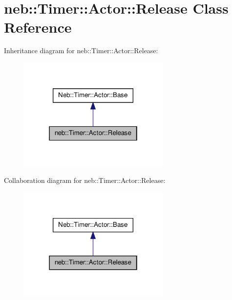 \hypertarget{classneb_1_1Timer_1_1Actor_1_1Release}{\section{neb\-:\-:\-Timer\-:\-:\-Actor\-:\-:\-Release \-Class \-Reference}
\label{classneb_1_1Timer_1_1Actor_1_1Release}
}


\-Inheritance diagram for neb\-:\-:\-Timer\-:\-:\-Actor\-:\-:\-Release\-:\nopagebreak
\begin{figure}[H]
\begin{center}
\leavevmode
\includegraphics[width=214pt]{classneb_1_1Timer_1_1Actor_1_1Release__inherit__graph}
\end{center}
\end{figure}


\-Collaboration diagram for neb\-:\-:\-Timer\-:\-:\-Actor\-:\-:\-Release\-:\nopagebreak
\begin{figure}[H]
\begin{center}
\leavevmode
\includegraphics[width=214pt]{classneb_1_1Timer_1_1Actor_1_1Release__coll__graph}
\end{center}
\end{figure}
